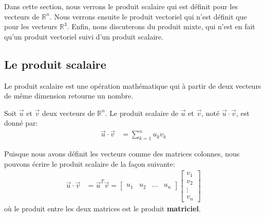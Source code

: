 \documentclass[]{book}
\theoremstyle{definition}
\theoremstyle{definition}
\theoremstyle{definition}
\theoremstyle{remark}
\let\BeginKnitrBlock\begin \let\EndKnitrBlock\end
\begin{document}
Dans cette section, nous verrons le produit scalaire qui est définit pour les vecteurs de \(\mathbb{R}^n\). Nous verrons ensuite le produit vectoriel qui n'est définit que pour les vecteurs \(\mathbb{R}^3\). Enfin, nous discuterons du produit mixte, qui n'est en fait qu'un produit vectoriel suivi d'un produit scalaire.

\hypertarget{le-produit-scalaire}{%
\subsection{Le produit scalaire}\label{le-produit-scalaire}}

Le produit scalaire est une opération mathématique qui à partir de deux vecteurs de même dimension retourne un nombre.

\BeginKnitrBlock{definition}[Le produit scalaire]
\protect\hypertarget{def:unnamed-chunk-180}{}{\label{def:unnamed-chunk-180} {} }Soit \(\overrightarrow{u}\) et \(\overrightarrow{v}\) deux vecteurs de \(\mathbb{R}^n\). Le produit scalaire de \(\overrightarrow{u}\) et \(\overrightarrow{v}\), noté \(\overrightarrow{u}\cdot \overrightarrow{v}\), est donné par:
\begin{align*}
\overrightarrow{u} \cdot \overrightarrow{v} &= \sum_{k=1}^n u_kv_k
\end{align*}

Puisque nous avons définit les vecteurs comme des matrices colonnes, nous pouvons écrire le produit scalaire de la façon suivante:
\begin{align*}
\overrightarrow{u} \cdot \overrightarrow{v} &= \overrightarrow{u}^T \overrightarrow{v} = 
\begin{bmatrix}
u_1 & u_2 & \ldots & u_n
\end{bmatrix}
\begin{bmatrix}
v_1 \\
v_2 \\
\vdots \\
v_n
\end{bmatrix}
\end{align*}
où le produit entre les deux matrices est le produit \textbf{matriciel}.
\EndKnitrBlock{definition}
\end{document}
